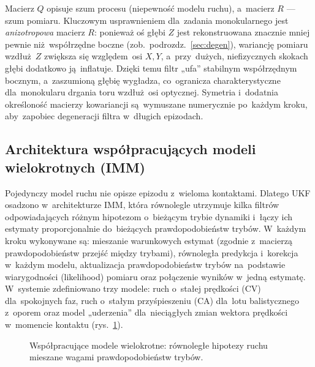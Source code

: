 \documentclass[14pt,a4paper]{extarticle}
\begin{document}
Macierz $Q$ opisuje szum procesu (niepewność modelu ruchu), a~macierz $R$ --- szum pomiaru.
Kluczowym usprawnieniem dla~zadania monokularnego jest \emph{anizotropowa} macierz $R$:
ponieważ oś głębi $Z$ jest rekonstruowana znacznie mniej pewnie niż~współrzędne boczne
(zob.~podrozdz.~\ref{sec:degen}), wariancję pomiaru wzdłuż~$Z$ zwiększa się względem~osi
$X,Y$, a~przy~dużych, niefizycznych skokach głębi dodatkowo ją~inflatuje. Dzięki temu filtr
„ufa” stabilnym współrzędnym bocznym, a~zaszumioną głębię wygładza, co~ogranicza
charakterystyczne dla~monokularu drgania toru wzdłuż~osi optycznej. Symetria i~dodatnia
określoność macierzy kowariancji są~wymuszane numerycznie po~każdym kroku, aby~zapobiec
degeneracji filtra w~długich epizodach.

\subsection{Architektura współpracujących modeli wielokrotnych (IMM)}
Pojedynczy model ruchu nie opisze epizodu z~wieloma kontaktami. Dlatego UKF osadzono
w~architekturze IMM, która równolegle utrzymuje kilka filtrów odpowiadających różnym
hipotezom o~bieżącym trybie dynamiki i~łączy ich estymaty proporcjonalnie do~bieżących
prawdopodobieństw trybów. W~każdym kroku wykonywane są: mieszanie warunkowych estymat
(zgodnie z~macierzą prawdopodobieństw przejść między trybami), równoległa predykcja
i~korekcja w~każdym modelu, aktualizacja prawdopodobieństw trybów na~podstawie
wiarygodności (likelihood) pomiaru oraz połączenie wyników w~jedną estymatę. W~systemie
zdefiniowano trzy modele: ruch o~stałej prędkości (CV) dla~spokojnych faz, ruch o~stałym
przyśpieszeniu (CA) dla~lotu balistycznego z~oporem oraz model „uderzenia” dla~nieciągłych
zmian wektora prędkości w~momencie kontaktu (rys.~\ref{fig:imm}).

\begin{figure}[H]
\centering
{}
\caption{Współpracujące modele wielokrotne: równoległe hipotezy ruchu mieszane wagami
  prawdopodobieństw trybów.}
\label{fig:imm}
\end{figure}
\end{document}
